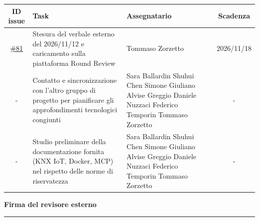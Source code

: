 \documentclass[11pt, a4paper]{article}
\begin{document}
\begin{table}[h]
    \centering
    \renewcommand{\arraystretch}{1.5}
    \begin{tabularx}{\textwidth}{|c|>{\raggedright\arraybackslash}X|>{\centering\arraybackslash}p{3.5cm}|c|}
        \hline
        \rowcolor{gray!10}
        \textbf{ID issue} &
        \textbf{Task} &
        \textbf{Assegnatario} &
        \textbf{Scadenza} \\
        \hline
        \href{https://github.com/On-By-One-Team/On-By-One.github.io/issues/81}{\#81} & Stesura del verbale esterno del 2026/11/12 e caricamento sulla piattaforma Round Review & Tommaso Zorzetto & 2026/11/18 \\
        \hline
        - & Contatto e sincronizzazione con l'altro gruppo di progetto per pianificare gli approfondimenti tecnologici congiunti & 
        Sara Ballardin \newline
        Shuhui Chen \newline
        Simone Giuliano \newline
        Alvise Greggio \newline
        Daniele Nuzzaci \newline
        Federico Temporin \newline
        Tommaso Zorzetto & - \\
        \hline
        - & Studio preliminare della documentazione fornita (KNX IoT, Docker, MCP) nel rispetto delle norme di riservatezza & 
        Sara Ballardin \newline
        Shuhui Chen \newline
        Simone Giuliano \newline
        Alvise Greggio \newline
        Daniele Nuzzaci \newline
        Federico Temporin \newline
        Tommaso Zorzetto & - \\
        \hline
    \end{tabularx}
\end{table}


\vfill
\hfill
\begin{minipage}{0.4\textwidth}
    \centering
    \textbf{Firma del revisore esterno}\par
    \vspace{1.5cm}
    \rule{\textwidth}{0.4pt}
\end{minipage}

\vspace{2cm}
\end{document}
